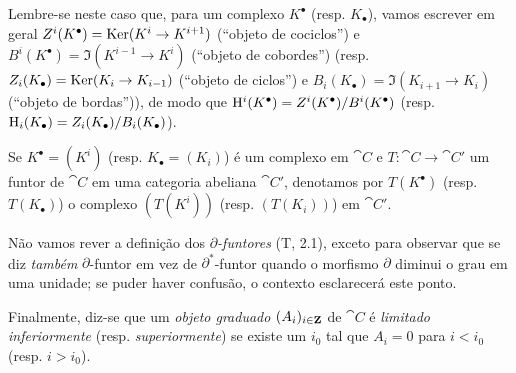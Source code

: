 \begin{env}[11.2.1]
Lembre-se neste caso que, para um complexo $K^\bullet$ (resp. $K_\bullet$), vamos escrever em geral $Z^i(K^\bullet)=\Ker(K^i\to K^{i+1})$ (``objeto de cociclos'') e $B^i(K^\bullet)=\Im(K^{i-1}\to K^i)$ (``objeto de cobordes'') (resp. $Z_i(K_\bullet)=\Ker(K_i\to K_{i-1})$ (``objeto de ciclos'') e $B_i(K_\bullet)=\Im(K_{i+1}\to K_i)$ (``objeto de bordas'')), de modo que $\mathrm{H}^i(K^\bullet)=Z^i(K^\bullet)/B^i(K^\bullet)$ (resp. $\mathrm{H}_i(K_\bullet)=Z_i(K_\bullet)/B_i(K_\bullet)$).

Se $K^\bullet=(K^i)$ (resp. $K_\bullet=(K_i)$) é um complexo em $\cat{C}$ e $T:\cat{C}\to\cat{C}'$ um funtor de $\cat{C}$ em uma categoria abeliana $\cat{C}'$, denotamos por $T(K^\bullet)$ (resp. $T(K_\bullet)$) o complexo $(T(K^i))$ (resp. $(T(K_i))$) em $\cat{C}'$.

Não vamos rever a definição dos \emph{$\partial$-funtores} (T, 2.1), exceto para observar que se diz \emph{também} $\partial$-funtor em vez de $\partial^*$-funtor quando o morfismo $\partial$ diminui o grau em uma unidade; se puder haver confusão, o contexto esclarecerá este ponto.

Finalmente, diz-se que um \emph{objeto graduado $(A_i)_{i\in\mathbf{Z}}$} de $\cat{C}$ é \emph{limitado inferiormente} (resp. \emph{superiormente}) se existe um $i_0$ tal que $A_i=0$ para $i<i_0$ (resp. $i>i_0$).
\end{env}

